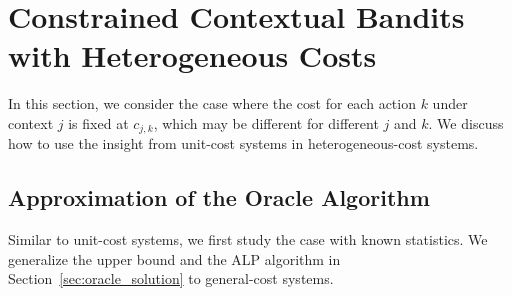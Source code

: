 \section{Constrained Contextual Bandits with Heterogeneous Costs} \label{app:het_cost}

In this section, we consider the case where the cost for each action $k$ under context $j$ is fixed at $c_{j,k}$, which may be different for different $j$ and $k$. We discuss how to use the insight from unit-cost systems in  heterogeneous-cost systems.

\subsection{Approximation of the Oracle Algorithm}
Similar to unit-cost systems, we first study the case with known statistics. We generalize the upper bound and the ALP algorithm in Section~\ref{sec:oracle_solution} to general-cost systems.

